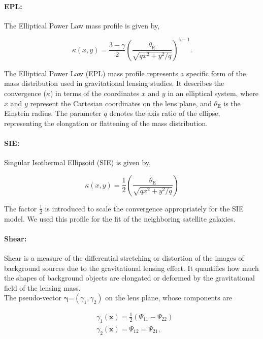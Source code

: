 \documentclass{aa}
\begin{document}
\paragraph{\textbf{EPL:}}
 The Elliptical Power Law mass profile is given by, 

$$
\kappa\left(x, y\right)=\frac{3-\gamma}{2}\left(\frac{\theta_{\mathrm{E}}}{\sqrt{q x^2+y^2 / q}}\right)^{\gamma-1}.
$$

The Elliptical Power Law (EPL) mass profile represents a specific form of the mass distribution used in gravitational lensing studies. It describes the convergence (\(\kappa\)) in terms of the coordinates \(x\) and \(y\) in an elliptical system, where \(x\) and \(y\) represent the Cartesian coordinates on the lens plane, and \(\theta_{\mathrm{E}}\) is the Einstein radius. The parameter \(q\) denotes the axis ratio of the ellipse, representing the elongation or flattening of the mass distribution.\\

\paragraph{\textbf{SIE:}} Singular Isothermal Ellipsoid (SIE) is given by,

$$
\kappa\left(x, y\right)=\frac{1}{2}\left(\frac{\theta_{\mathrm{E}}}{\sqrt{q x^2+y^2 / q}}\right)
$$

The factor $\frac{1}{2}$ is introduced to scale the convergence appropriately for the SIE model. We used this profile for the fit of the neighboring satellite galaxies.
\\

\paragraph{\textbf{Shear:}} Shear is a measure of the differential stretching or distortion of the images of background sources due to the gravitational lensing effect. It quantifies how much the shapes of background objects are elongated or deformed by the gravitational field of the lensing mass.\\


The pseudo-vector $\bm{\gamma}$=$(\gamma_1, \gamma_2)$ on the lens plane, whose components are
%

\begin{equation}
    \begin{aligned}
        & \gamma_1(\bm{x})=\frac{1}{2}\left(\Psi_{11}-\Psi_{22}\right) \\
        & \gamma_2(\bm{x})=\Psi_{12}=\Psi_{21},
    \end{aligned}
\end{equation}
\end{document}
